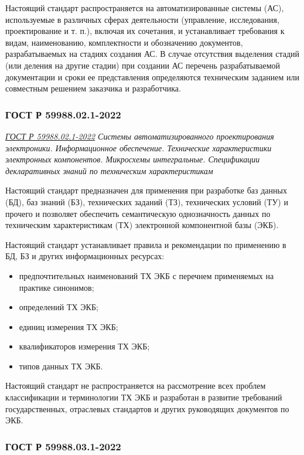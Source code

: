 Настоящий стандарт распространяется на автоматизированные системы (АС),
используемые в различных сферах деятельности
(управление, исследования, проектирование и т. п.), включая их сочетания,
и устанавливает требования к видам, наименованию,
комплектности и обозначению документов, разрабатываемых на стадиях создания АС.
В случае отсутствия выделения стадий (или деления на другие стадии)
при создании АС перечень разрабатываемой документации
и сроки ее представления определяются техническим заданием
или совместным решением заказчика и разработчика.

\subsubsection{ГОСТ Р 59988.02.1-2022}

\emph{\href{https://docs.cntd.ru/document/1200192137}{ГОСТ Р 59988.02.1-2022}
Системы автоматизированного проектирования электроники.
Информационное обеспечение.
Технические характеристики электронных компонентов.
Микросхемы интегральные.
Спецификации декларативных знаний по техническим характеристикам
}

Настоящий стандарт предназначен для применения при разработке
баз данных (БД), баз знаний (БЗ), технических заданий (ТЗ),
технических условий (ТУ) и прочего
и позволяет обеспечить семантическую однозначность данных
по техническим характеристикам (ТХ) электронной компонентной базы (ЭКБ).

Настоящий стандарт устанавливает правила и рекомендации
по применению в БД, БЗ и других информационных ресурсах:

\begin{itemize}
	\item предпочтительных наименований ТХ ЭКБ
		с перечнем применяемых на практике синонимов;
	\item определений ТХ ЭКБ;
	\item единиц измерения ТХ ЭКБ;
	\item квалификаторов измерения ТХ ЭКБ;
	\item типов данных ТХ ЭКБ.
\end{itemize}

Настоящий стандарт не распространяется на рассмотрение
всех проблем классификации и терминологии ТХ ЭКБ
и разработан в развитие требований государственных,
отраслевых стандартов и других руководящих документов по ЭКБ.

\subsubsection{ГОСТ Р 59988.03.1-2022}

